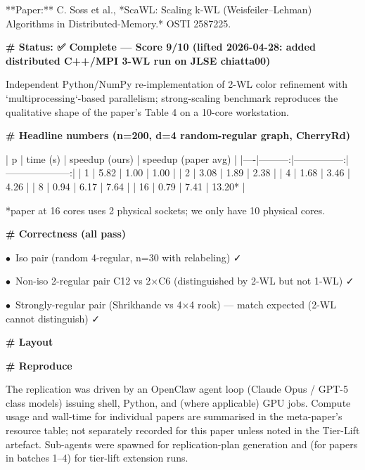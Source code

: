 \documentclass[11pt]{article}
\begin{document}
**Paper:** C. Soss et al., *ScaWL: Scaling k-WL (Weisfeiler–Lehman) Algorithms in Distributed-Memory.* OSTI 2587225.

\par\medskip\textbf{\# Status: ✅ Complete — Score 9/10 (lifted 2026-04-28: added distributed C++/MPI 3-WL run on JLSE chiatta00)}\par

Independent Python/NumPy re-implementation of 2-WL color refinement with
`multiprocessing`-based parallelism; strong-scaling benchmark reproduces the
qualitative shape of the paper's Table 4 on a 10-core workstation.

\par\medskip\textbf{\# Headline numbers (n=200, d=4 random-regular graph, CherryRd)}\par

| p  | time (s) | speedup (ours) | speedup (paper avg) |
|----|---------:|---------------:|--------------------:|
| 1  | 5.82     | 1.00           | 1.00   |
| 2  | 3.08     | 1.89           | 2.38   |
| 4  | 1.68     | 3.46           | 4.26   |
| 8  | 0.94     | 6.17           | 7.64   |
| 16 | 0.79     | 7.41           | 13.20* |

*paper at 16 cores uses 2 physical sockets; we only have 10 physical cores.

\par\medskip\textbf{\# Correctness (all pass)}\par
\par$\bullet$\ Iso pair (random 4-regular, n=30 with relabeling) ✓
\par$\bullet$\ Non-iso 2-regular pair C12 vs 2×C6 (distinguished by 2-WL but not 1-WL) ✓
\par$\bullet$\ Strongly-regular pair (Shrikhande vs 4×4 rook) — match expected (2-WL cannot distinguish) ✓

\par\medskip\textbf{\# Layout}\par
[code block omitted]

\par\medskip\textbf{\# Reproduce}\par
[code block omitted]
\normalsize

The replication was driven by an OpenClaw agent loop (Claude Opus / GPT-5 class models) issuing shell, Python, and (where applicable) GPU jobs. Compute usage and wall-time for individual papers are summarised in the meta-paper's resource table; not separately recorded for this paper unless noted in the Tier-Lift artefact. Sub-agents were spawned for replication-plan generation and (for papers in batches 1--4) for tier-lift extension runs.
\end{document}
